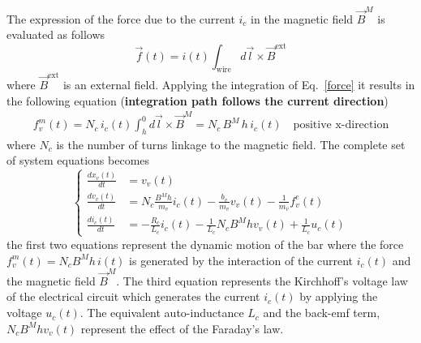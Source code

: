 \documentclass[12pt,a4paper,oneside]{book}
\begin{document}
\begin{onehalfspace}
The expression of the force due to the current $i_c$ in the magnetic field $\vec{B}^M$ is evaluated as follows 
\begin{equation}\label{}
	\vec{f}(t) = i(t)\int_{\text{wire}}d\vec{l}\times\vec{B}^{\text{ext}}
\end{equation}
where $\vec{B}^{\text{ext}}$ is an external field. Applying the integration of Eq.~\eqref{force} it results in the following equation (\textbf{integration path follows the current direction})
\begin{equation}\label{}
	\begin{aligned}
		f_v^m(t) = N_c\,i_c(t)\int_{h}^{0}d\vec{l}\times\vec{B}^M=N_c\,B^M\,h\,i_c(t)\quad \text{positive x-direction}
	\end{aligned}
\end{equation}
where $N_c$ is the number of turns linkage to the magnetic field.
The complete set of system equations becomes
\begin{equation}\label{}
	\left\lbrace \begin{aligned}
		\frac{dx_v(t)}{dt} &= v_v(t) \\[6pt]
		\frac{dv_v(t)}{dt} &= N_c\frac{B^Mh}{m_v} i_c(t)-\frac{b_v}{m_v} v_v(t)-\frac{1}{m_v}f^e_v(t) \\[6pt]
		\frac{di_c(t)}{dt} &= -\frac{R_c}{L_c}i_c(t)-\frac{1}{L_c}N_cB^Mhv_v(t)+\frac{1}{L_c}u_c(t)
	\end{aligned}\right. 
\end{equation}
the first two equations represent the dynamic motion of the bar where the force $f_v^m(t)=N_cB^Mh\,i(t)$ is generated by the interaction of the current $i_c(t)$ and the magnetic field $\vec{B}^M$. The third equation represents the Kirchhoff's voltage law of the electrical circuit which generates the current $i_c(t)$ by applying the voltage $u_c(t)$. The equivalent auto-inductance $L_c$ and the back-emf term, $N_cB^Mhv_v(t)$ represent the effect of the Faraday's law.


\end{onehalfspace}
\end{document}
